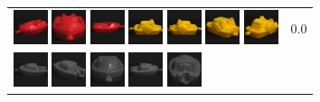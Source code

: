 {\begin{figure}[p]
\begin{tabular}{m{11cm} | m{3cm} |}
\includegraphics[width=1cm]{coil/beeld-21.eps}
\includegraphics[width=1cm]{coil/beeld-20.eps}
\includegraphics[width=1cm]{coil/beeld-19.eps}
\includegraphics[width=1cm]{coil/beeld-12.eps}
\includegraphics[width=1cm]{coil/beeld-13.eps}
\includegraphics[width=1cm]{coil/beeld-16.eps}
\includegraphics[width=1cm]{coil/beeld-15.eps}
& {\scriptsize 0.0}
\\
\includegraphics[width=1cm]{coil/beeld-24.eps}
\includegraphics[width=1cm]{coil/beeld-25.eps}
\includegraphics[width=1cm]{coil/beeld-28.eps}
\includegraphics[width=1cm]{coil/beeld-27.eps}
\includegraphics[width=1cm]{coil/beeld-26.eps}

\end{tabular}
\end{figure}}
